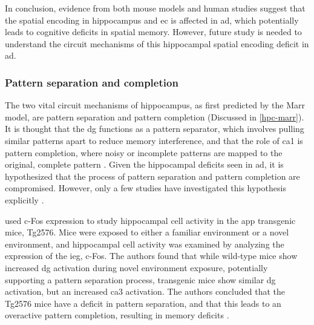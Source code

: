 In conclusion, evidence from both mouse models and human studies suggest that the spatial encoding in hippocampus and \gls{ec} is affected in \gls{ad}, which potentially leads to cognitive deficits in spatial memory. However, future study is needed to understand the circuit mechanisms of this hippocampal spatial encoding deficit in \gls{ad}.

\subsubsection{Pattern separation and completion}
The two vital circuit mechanisms of hippocampus, as first predicted by the Marr model, are pattern separation and pattern completion (Discussed in \ref{hpc-marr}). It is thought that the \gls{dg} functions as a pattern separator, which involves pulling similar patterns apart to reduce memory interference, and that the role of \gls{ca1} is pattern completion, where noisy or incomplete patterns are mapped to the original, complete pattern \citep{rolls13}. Given the hippocampal deficits seen in \gls{ad}, it is hypothesized that the process of pattern separation and pattern completion are compromised. However, only a few studies have investigated this hypothesis explicitly \citep{maruszak14}. 

\citet{palmer11} used c-Fos expression to study hippocampal cell activity in the \gls{app} transgenic mice, Tg2576. Mice were exposed to either a familiar environment or a novel environment, and hippocampal cell activity was examined by analyzing the expression of the \gls{ieg}, c-Fos. The authors found that while wild-type mice show increased \gls{dg} activation during novel environment exposure, potentially supporting a pattern separation process, transgenic mice show similar \gls{dg} activation, but an increased \gls{ca3} activation. The authors concluded that the Tg2576 mice have a deficit in pattern separation, and that this leads to an overactive pattern completion, resulting in memory deficits \citep{palmer11}.

